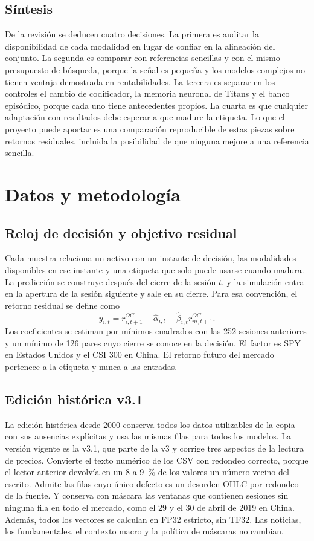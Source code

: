\documentclass[11pt,a4paper]{report}
\begin{document}
\section{Síntesis}
De la revisión se deducen cuatro decisiones. La primera es auditar la
disponibilidad de cada modalidad en lugar de confiar en la alineación del
conjunto. La segunda es comparar con referencias sencillas y con el mismo
presupuesto de búsqueda, porque la señal es pequeña y los modelos complejos no
tienen ventaja demostrada en rentabilidades. La tercera es separar en los
controles el cambio de codificador, la memoria neuronal de Titans y el banco
episódico, porque cada uno tiene antecedentes propios. La cuarta es que
cualquier adaptación con resultados debe esperar a que madure la etiqueta. Lo
que el proyecto puede aportar es una comparación reproducible de estas piezas
sobre retornos residuales, incluida la posibilidad de que ninguna mejore a una
referencia sencilla.

\chapter{Datos y metodología}
\label{cap:datos}

\section{Reloj de decisión y objetivo residual}
Cada muestra relaciona un activo con un instante de decisión, las modalidades
disponibles en ese instante y una etiqueta que solo puede usarse cuando
madura. La predicción se construye después del cierre de la sesión $t$, y la
simulación entra en la apertura de la sesión siguiente y sale en su cierre.
Para esa convención, el retorno residual se define como
\begin{equation}
y_{i,t} = r^{OC}_{i,t+1} - \hat\alpha_{i,t}
          - \hat\beta_{i,t} r^{OC}_{m,t+1}.
\end{equation}
Los coeficientes se estiman por mínimos cuadrados con las 252 sesiones
anteriores y un mínimo de 126 pares cuyo cierre se conoce en la decisión. El
factor es SPY en Estados Unidos y el CSI 300 en China. El retorno futuro del
mercado pertenece a la etiqueta y nunca a las entradas.

\section{Edición histórica v3.1}
La edición histórica desde 2000 conserva todos los datos utilizables de la
copia con sus ausencias explícitas y usa las mismas filas para todos los
modelos. La versión vigente es la v3.1, que parte de la v3 y corrige tres
aspectos de la lectura de precios. Convierte el texto numérico de los CSV con
redondeo correcto, porque el lector anterior devolvía en un 8 a 9~\% de los
valores un número vecino del escrito. Admite las filas cuyo único defecto es
un desorden OHLC por redondeo de la fuente. Y conserva con máscara las
ventanas que contienen sesiones sin ninguna fila en todo el mercado, como el
29 y el 30 de abril de 2019 en China. Además, todos los vectores se calculan
en FP32 estricto, sin TF32. Las noticias, los fundamentales, el contexto macro
y la política de máscaras no cambian.
\end{document}
